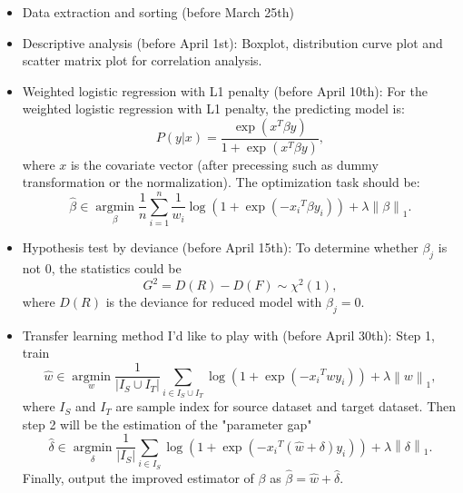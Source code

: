 \documentclass[a4paper]{article}
\begin{document}
\begin{itemize}
  \item Data extraction and sorting (before March 25th)
  \item Descriptive analysis (before April 1st): Boxplot, distribution curve plot and scatter matrix plot for correlation analysis.
  \item Weighted logistic regression with L1 penalty (before April 10th): For the weighted logistic regression with L1 penalty, the predicting model is:
  \begin{equation*}
  P\left( {y\left| x \right.} \right) = \frac{{\exp \left( {{x^T}\beta y} \right)}}{{1 + \exp \left( {{x^T}\beta y} \right)}},
  \end{equation*}
  where $x$ is the covariate vector (after precessing such as dummy transformation or the normalization). The optimization task should be:
  \begin{equation*}
\hat \beta  \in \mathop {\arg \min }\limits_\beta  \frac{1}{n}\sum\limits_{i = 1}^n \frac{1}{w_i}{\log \left( {1 + \exp \left( { - {x_i}^T\beta {y_i}} \right)} \right)}  + \lambda {\left\| \beta  \right\|_1}.
  \end{equation*}
  \item Hypothesis test by deviance (before April 15th): To determine whether $\beta_j$ is not 0, the statistics could be
  \begin{equation*}
  {G^2} = D\left( R \right) - D\left( F \right) \sim {\chi ^2}\left( 1 \right),
  \end{equation*}
  where $D\left( R \right)$ is the deviance for reduced model with $\beta_j=0$.
  \item Transfer learning method I'd like to play with (before April 30th): Step 1, train
  \begin{equation*}
\hat w \in \mathop {\arg \min }\limits_w \frac{1}{{\left| {{I_S} \cup {I_T}} \right|}}\sum\limits_{i \in {I_S} \cup {I_T}} {\log \left( {1 + \exp \left( { - {x_i}^Tw{y_i}} \right)} \right)}  + \lambda {\left\| w \right\|_1},
  \end{equation*}
  where $I_S$ and $I_T$ are sample index for source dataset and target dataset. Then step 2 will be the estimation of the "parameter gap"
\begin{equation*}
\hat \delta  \in \mathop {\arg \min }\limits_\delta  \frac{1}{{\left| {{I_S}} \right|}}\sum\limits_{i \in {I_S}} {\log \left( {1 + \exp \left( { - {x_i}^T\left( {\hat w + \delta } \right){y_i}} \right)} \right)}  + \lambda {\left\| \delta  \right\|_1}.
\end{equation*}
Finally, output the improved estimator of $\beta$ as $\hat \beta  = \hat w + \hat \delta $.
\end{itemize}
\end{document}
